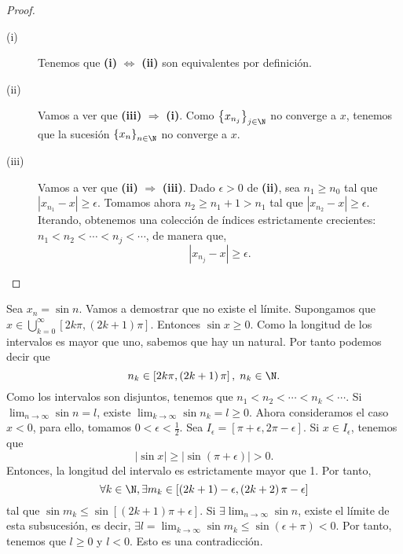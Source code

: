 \begin{proof}
\begin{description}
\item[(i)] Tenemos que \textbf{(i)} $\displaystyle  \iff  $ \textbf{(ii)} son equivalentes por definición. 
\item[(ii)] Vamos a ver que \textbf{(iii)} $\displaystyle \Rightarrow  $ \textbf{(i)}. Como $\displaystyle \left\{ x_{n_{j}}\right\} _{j\in\N} $ no converge a $\displaystyle x $, tenemos que la sucesión $\displaystyle \left\{ x_{n}\right\} _{n\in\N} $ no converge a $\displaystyle x $.
\item[(iii)] Vamos a ver que \textbf{(ii)} $\displaystyle  \Rightarrow  $ \textbf{(iii)}. Dado $\displaystyle \epsilon > 0 $ de \textbf{(ii)}, sea $\displaystyle n_{1} \geq n_{0} $  tal que $\displaystyle \left|x_{n_{1}}-x\right| \geq \epsilon  $. Tomamos ahora $\displaystyle n_{2} \geq n_{1}+1 > n_{1} $ tal que $\displaystyle \left|x_{n_{2}}-x\right| \geq \epsilon  $. Iterando, obtenemos una colección de índices estrictamente crecientes: $\displaystyle n_{1} < n_{2} < \cdots < n_{j} < \cdots  $, de manera que, 
	\[ \left| x_{n_{j}} - x\right| \geq \epsilon  .\]
\end{description}
\end{proof}

\begin{eg}
	\normalfont Sea $\displaystyle x_{n} = \sin n $. Vamos a demostrar que no existe el límite. Supongamos que $\displaystyle x \in \bigcup_{k=0}^{\infty}\left[2k\pi, \left(2k+1\right)\pi\right]  $. Entonces $\displaystyle \sin x \geq 0 $. Como la longitud de los intervalos es mayor que uno, sabemos que hay un natural. Por tanto podemos decir que 
	\[n_{k} \in \left[2k\pi, \left(2k+1\right)\pi\right], \; n_{k} \in \N  .\]
	Como los intervalos son disjuntos, tenemos que $\displaystyle n_{1} < n_{2} < \cdots < n_{k} < \cdots  $. Si $\displaystyle \lim_{n \to \infty}\sin n = l$, existe $\displaystyle \lim_{k \to \infty} \sin n_{k} = l \geq 0 $. Ahora consideramos el caso $\displaystyle x < 0 $, para ello, tomamos $\displaystyle 0 < \epsilon < \frac{1}{2} $. Sea $\displaystyle I_{\epsilon } = \left[\pi+\epsilon, 2\pi-\epsilon \right]  $. Si $\displaystyle x \in I_{\epsilon } $, tenemos que 
\[\displaystyle \left|\sin x\right| \geq \left|\sin (\pi + \epsilon)\right| > 0. \]
	Entonces, la longitud del intervalo es estrictamente mayor que 1. Por tanto, 
\[\displaystyle \forall k \in \N, \exists m_{k} \in  \left[\left(2k+1\right)-\epsilon, \left(2k+2\right)\pi-\epsilon\right]  \]
	tal que $\displaystyle \sin m_{k} \leq \sin [\left(2k+1\right)\pi+\epsilon] $. Si $\displaystyle \exists \lim_{n \to \infty}\sin n $, existe el límite de esta subsucesión, es decir, $\displaystyle \exists l =\lim_{k \to \infty}\sin m_{k} \leq \sin \left(\epsilon + \pi\right) < 0 $. Por tanto, tenemos que $\displaystyle l \geq 0$ y $\displaystyle l < 0 $. Esto es una contradicción. 
\end{eg}

